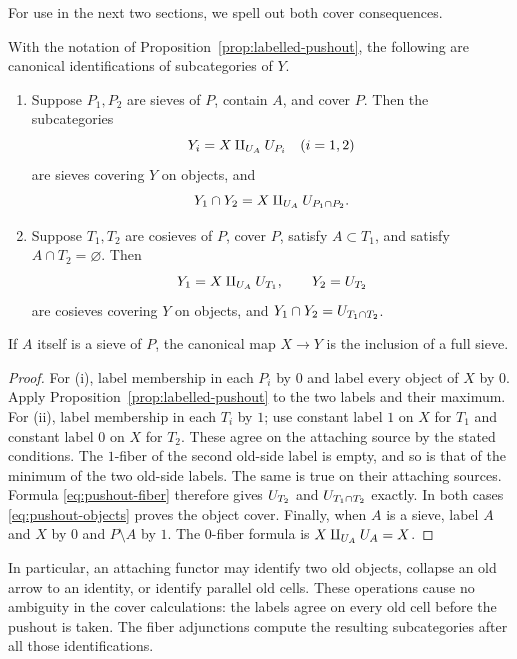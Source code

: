 For use in the next two sections, we spell out both cover consequences.

\begin{corollary}
\label{cor:attachment-covers}
With the notation of Proposition~\ref{prop:labelled-pushout}, the
following are canonical identifications of subcategories of $Y$.
\begin{enumerate}[label=\textup{(\roman*)}]
\item Suppose $P_1,P_2$ are sieves of $P$, contain $A$, and cover $P$.
Then the subcategories
\[
 Y_i=X\amalg_{U_{A}}U_{P_i}\quad(i=1,2)
\]
are sieves covering $Y$ on objects, and
\[
 Y_1\cap Y_2
 =X\amalg_{U_{A}}U_{P_1\cap P_2}.
\]
\item Suppose $T_1,T_2$ are cosieves of $P$, cover $P$, satisfy
$A\subset T_1$, and satisfy $A\cap T_2=\varnothing$.  Then
\[
 Y_1=X\amalg_{U_{A}}U_{T_1},\qquad Y_2=U_{T_2}
\]
are cosieves covering $Y$ on objects, and
$Y_1\cap Y_2=U_{T_1\cap T_2}$.
\end{enumerate}
If $A$ itself is a sieve of $P$, the canonical map $X\to Y$ is the
inclusion of a full sieve.
\end{corollary}

\begin{proof}
For (i), label membership in each $P_i$ by $0$ and label every object
of $X$ by $0$.  Apply Proposition~\ref{prop:labelled-pushout} to the
two labels and their maximum.  For (ii), label membership in each
$T_i$ by $1$; use constant label $1$ on $X$ for $T_1$ and constant
label $0$ on $X$ for $T_2$.  These agree on the attaching source by
the stated conditions.  The $1$-fiber of the second old-side label
is empty, and so is that of the minimum of the two old-side labels.
The same is true on their attaching sources.  Formula
\eqref{eq:pushout-fiber} therefore gives $U_{T_2}$ and
$U_{T_1\cap T_2}$ exactly.  In both cases
\eqref{eq:pushout-objects} proves the object cover.  Finally, when
$A$ is a sieve, label $A$ and $X$ by $0$ and $P\setminus A$ by $1$.
The $0$-fiber formula is $X\amalg_{U_{A}}U_{A}=X$.
\end{proof}

In particular, an attaching functor may identify two old objects,
collapse an old arrow to an identity, or identify parallel old cells.
These operations cause no ambiguity in the cover calculations: the
labels agree on every old cell before the pushout is taken.  The
fiber adjunctions compute the resulting subcategories after all those
identifications.

